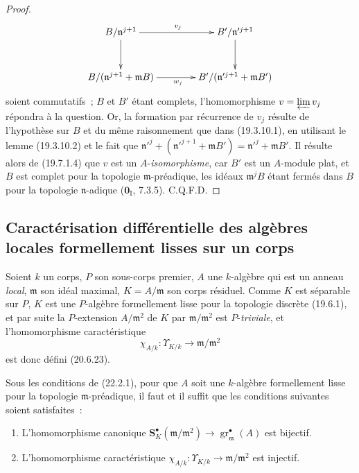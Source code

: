 \begin{proof}
\[\xymatrix@C=4em@R=3em{
  B/\mathfrak n^{j+1} \ar[r]^{v_j} \ar[d] &
  B'/\mathfrak n'^{j+1} \ar[d] \\
  B/(\mathfrak n^{j+1}+\mathfrak mB) \ar[r]_{w_j} &
  B'/(\mathfrak n'^{j+1}+\mathfrak mB')
}
\]
soient commutatifs~; $B$ et $B'$ étant complets, l'homomorphisme
$v=\varprojlim v_j$ répondra à la question.
Or, la formation par récurrence de $v_j$ résulte de l'hypothèse sur $B$ et
du
même raisonnement que dans (19.3.10.1), en utilisant le lemme
(19.3.10.2) et le fait que
$\mathfrak n'^j+(\mathfrak n'^{j+1}+\mathfrak mB')=\mathfrak n'^j+\mathfrak mB'$.
Il résulte alors de (19.7.1.4) que $v$ est un $A$-\emph{isomorphisme}, car
$B'$ est un $A$-module plat, et $B$ est complet pour la topologie
$\mathfrak m$-préadique, les idéaux $\mathfrak m^jB$ étant fermés dans $B$
pour la topologie $\mathfrak n$-adique ($\mathbf 0_{\mathrm I}$, 7.3.5).
C.Q.F.D.
\end{proof}

\subsection{Caractérisation différentielle des algèbres locales formellement
lisses sur un corps}
\label{subsection:0.22.2-fr}

\begin{env}[22.2.1]
\label{0.22.2.1-fr}
Soient $k$ un corps, $P$ son sous-corps premier, $A$ une $k$-algèbre qui est
un anneau \emph{local}, $\mathfrak m$ son idéal maximal, $K=A/\mathfrak m$
son corps résiduel. Comme $K$ est séparable sur $P$, $K$ est une
$P$-algèbre formellement lisse pour la topologie discrète (19.6.1), et par
suite la $P$-extension $A/\mathfrak m^2$ de $K$ par
$\mathfrak m/\mathfrak m^2$ est $P$-\emph{triviale}, et l'homomorphisme
caractéristique
\begin{equation}
\tag{22.2.1.1}
\label{0.22.2.1.1-fr}
  \chi_{A/k}:\Upsilon_{K/k}\longrightarrow\mathfrak m/\mathfrak m^2
\end{equation}
est donc défini (20.6.23).
\end{env}

\begin{theorem}[22.2.2]
\label{0.22.2.2-fr}
Sous les conditions de \textup{(22.2.1)}, pour que $A$ soit une $k$-algèbre
formellement lisse pour la topologie $\mathfrak m$-préadique, il faut et il
suffit que les conditions suivantes soient satisfaites~:
\begin{enumerate}
  \item[\textup{(i)}] L'homomorphisme canonique
  $\mathbf S_K^\bullet(\mathfrak m/\mathfrak m^2)\to
  \operatorname{gr}_{\mathfrak m}^\bullet(A)$ est bijectif.
  \item[\textup{(ii)}] L'homomorphisme caractéristique
  $\chi_{A/k}:\Upsilon_{K/k}\to\mathfrak m/\mathfrak m^2$ est injectif.
\end{enumerate}
\end{theorem}

